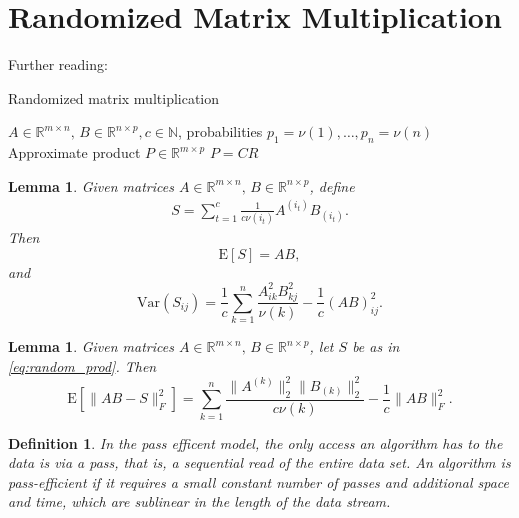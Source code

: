 \documentclass[13pt]{article}
\newtheorem{lem}[thm]{Lemma}
\theoremstyle{plain}
\newtheorem{defi}[thm]{Definition}
\newcommand{\R}{\mathbb{R}}
\newcommand{\N}{\mathbb{N}}
\newcommand{\V}{\mathrm{Var}}
\newcommand{\E}{\bm{\mathrm{E}}}
\begin{document}
\tableofcontents

\newpage

\setcounter{section}{1} %

\section{Randomized Matrix Multiplication}

Further reading: \cite{ln_random_linear16}

\begin{algorithm}
\caption{Randomized matrix multiplication}\label{alg:random_mult}
\begin{algorithmic}
    \Require $A \in \R^{m \times n},\, B \in \R^{n \times p}, c \in \N$, probabilities $p_1 = \nu(1), \ldots, p_n = \nu(n)$
    \Ensure Approximate product $P \in \R^{m \times p}$
    \EndFor
    \State \Return $P = CR$ 
\end{algorithmic}
\end{algorithm}

\begin{lem}
    Given matrices $A \in \R^{m \times n},\, B \in \R^{n \times p}$, define
    \begin{align}\label{eq:random_prod}
        S = \sum_{t=1}^c \frac{1}{c\nu(i_t)} A^{(i_t)} B_{(i_t)}. \tag{$\ast$}
    \end{align}
    Then
    \[
        \E[S] = AB,
    \]
    and
    \[
        \V(S_{ij}) = \frac{1}{c} \sum_{k = 1}^n \frac{A_{ik}^2B_{kj}^2}{\nu(k)} - \frac{1}{c}(AB)^2_{ij}.
    \]
\end{lem}

\begin{lem}
    Given matrices $A \in \R^{m \times n},\, B \in \R^{n \times p}$, let $S$ be
    as in \eqref{eq:random_prod}.
    Then
    \[
        \E\left[\|AB - S\|_F^2\right] = \sum_{k=1}^n \frac{\|A^{(k)}\|_2^2\|B_{(k)}\|_2^2}{c\nu(k)} - \frac{1}{c} \|AB\|_F^2.
    \]
\end{lem}

\begin{defi}
    In the pass efficent model, the only access an algorithm has to the data is via a pass, that is,
    a sequential read of the entire data set. An algorithm is \emph{pass-efficient} if it requires a small
    constant number of passes and additional space and time, which are sublinear in the length of the
    data stream.
\end{defi}
\end{document}
